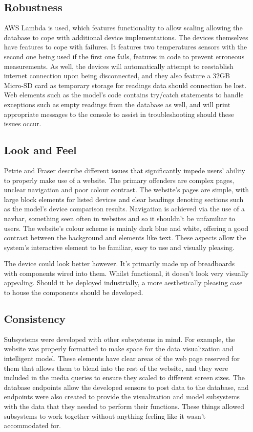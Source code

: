 \documentclass[]{report}
\begin{document}
	\subsection{Robustness}
	AWS Lambda is used, which features functionality to allow scaling\cite{awslambdadocs} allowing the database to cope with additional device implementations. The devices themselves have features to cope with failures. It features two temperatures sensors with the second one being used if the first one fails, features in code to prevent erroneous measurements. As well, the devices will automatically attempt to reestablish internet connection upon being disconnected, and they also feature a 32GB Micro-SD card as temporary storage for readings data should connection be lost. Web elements such as the model's code contains try/catch statements to handle exceptions such as empty readings from the database as well, and will print appropriate messages to the console to assist in troubleshooting should these issues occur.
	
	\subsection{Look and Feel}
	Petrie and Fraser\cite{petrie2004tension} describe different issues that significantly impede users' ability to properly make use of a website. The primary offenders are complex pages, unclear navigation and poor colour contrast. The website's pages are simple, with large block elements for listed devices and clear headings denoting sections such as the model's device comparison results. Navigation is achieved via the use of a navbar, something seen often in websites and so it shouldn't be unfamiliar to users. The website's colour scheme is mainly dark blue and white, offering a good contrast between the background and elements like text. These aspects allow the system's interactive element to be familiar, easy to use and visually pleasing.
	\medskip
	
	The device could look better however. It's primarily made up of breadboards with components wired into them. Whilst functional, it doesn't look very visually appealing. Should it be deployed industrially, a more aesthetically pleasing case to house the components should be developed.
	
	\subsection{Consistency}
	Subsystems were developed with other subsystems in mind. For example, the website was properly formatted to make space for the data visualization and intelligent model. These elements have clear areas of the web page reserved for them that allows them to blend into the rest of the website, and they were included in the media queries to ensure they scaled to different screen sizes. The database endpoints allow the developed sensors to post data to the database, and endpoints were also created to provide the visualization and model subsystems with the data that they needed to perform their functions. These things allowed subsystems to work together without anything feeling like it wasn't accommodated for.
	
\end{document}
